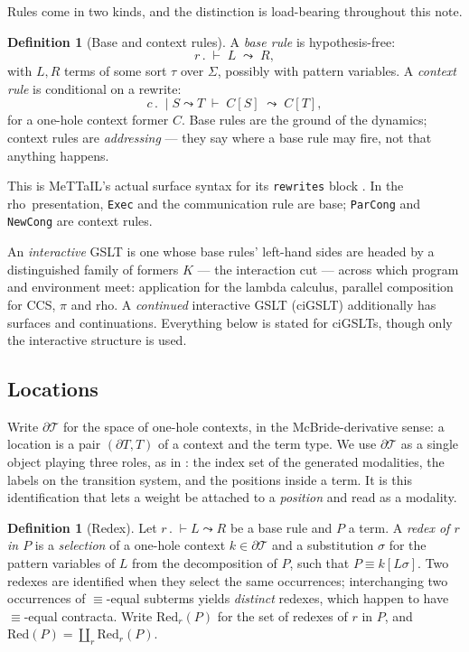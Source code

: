 \documentclass[11pt,a4paper]{article}
\theoremstyle{plain}
\theoremstyle{definition}
\newtheorem{definition}[theorem]{Definition}
\theoremstyle{remark}
\newcommand{\rhoc}{\textsf{rho}}
\newcommand{\Terms}{\mathcal{T}}
\newcommand{\Red}{\mathrm{Red}}
\begin{document}
Rules come in two kinds, and the distinction is load-bearing throughout this note.

\begin{definition}[Base and context rules]
\label{def:rules}
A \emph{base rule} is hypothesis-free:
\[
r \,.\; \vdash\; L \;\leadsto\; R,
\]
with $L, R$ terms of some sort $\tau$ over $\Sigma$, possibly with pattern variables. A
\emph{context rule} is conditional on a rewrite:
\[
c \,.\; \mid S \leadsto T \;\vdash\; C[S] \;\leadsto\; C[T],
\]
for a one-hole context former $C$. Base rules are the ground of the dynamics; context rules are
\emph{addressing} --- they say where a base rule may fire, not that anything happens.
\end{definition}

This is MeTTaIL's actual surface syntax for its \texttt{rewrites} block \cite{mettail}. In the
\rhoc\ presentation, \texttt{Exec} and the communication rule are base; \texttt{ParCong} and
\texttt{NewCong} are context rules.

An \emph{interactive} GSLT is one whose base rules' left-hand sides are headed by a distinguished
family of formers $K$ --- the interaction cut --- across which program and environment meet:
application for the lambda calculus, parallel composition for CCS, $\pi$ and \rhoc. A
\emph{continued} interactive GSLT (ciGSLT) additionally has surfaces and continuations. Everything
below is stated for ciGSLTs, though only the interactive structure is used.

\subsection{Locations}

Write $\partial \Terms$ for the space of one-hole contexts, in the McBride-derivative sense: a
location is a pair $(\partial T, T)$ of a context and the term type. We use $\partial \Terms$ as a
single object playing three roles, as in \cite{omnibus}: the index set of the generated modalities,
the labels on the transition system, and the positions inside a term. It is this identification that
lets a weight be attached to a \emph{position} and read as a modality.

\begin{definition}[Redex]
\label{def:redex}
Let $r \,.\; \vdash L \leadsto R$ be a base rule and $P$ a term. A \emph{redex of $r$ in $P$} is a
\emph{selection} of a one-hole context $k \in \partial\Terms$ and a substitution $\sigma$ for the
pattern variables of $L$ from the decomposition of $P$, such that $P \equiv k[L\sigma]$. Two redexes
are identified when they select the same occurrences; interchanging two occurrences of
$\equiv$-equal subterms yields \emph{distinct} redexes, which happen to have $\equiv$-equal
contracta. Write $\Red_r(P)$ for the set of redexes of $r$ in $P$, and
$\Red(P) = \coprod_r \Red_r(P)$.
\end{definition}
\end{document}
